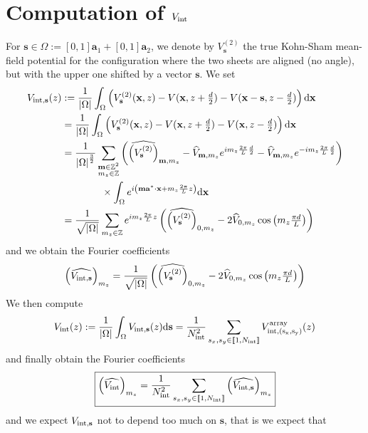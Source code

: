 \documentclass[11pt,a4paper,reqno,french,tikz]{amsart}
\def\d{{\rm d}}
\newcommand{\intent}[1]{\llbracket #1 \rrbracket}
\newcommand{\pa}[1]{\left( #1 \right)} %
\newcommand{\ab}[1]{\left|#1\right|} %
\newcommand{\f}[2]{\frac{#1}{#2}} %
\newcommand{\ind}[1]{_{\textup{#1}}} %
\def\ba{{\mathbf a}}
\def\bx{{\mathbf x}}
\def\bmm{{\mathbf m}}
\def\bs{{\mathbf s}}
\newcommand{\dd}{\tfrac{d}{2}}
\begin{document}
\section{Computation of $V\ind{int}$}%
\label{sec:computation_of_vint_}

For $\bs \in \Omega := [0,1] \ba_1 + [0,1] \ba_2$, we denote by $V^{(2)}_{\bs}$ the true Kohn-Sham mean-field potential for the configuration where the two sheets are aligned (no angle), but with the upper one shifted by a vector $\bs$. We set
\begin{align*}
	V_{\rm int, \bs}(z) &:= \f{1}{\ab{\Omega}} \int_{\Omega}  \left( V^{(2)}_{\bs}(\bx, z) - V(\bx, z + \dd) - V(\bx - \bs, z -\dd)   \right) \d \bx \\
	&= \f{1}{\ab{\Omega}} \int_{\Omega}  \left( V^{(2)}_{\bs}(\bx, z) - V(\bx, z + \dd) - V(\bx, z -\dd)   \right) \d \bx \\
    &= \f{1}{\ab{\Omega}^{\f 32}} \sum_{\substack{\bmm \in \Z^2 \\ m_z \in \Z}}  \pa{ \widehat{\pa{V^{(2)}_{\bs}}}_{\bmm,m_z} - \widehat{V}_{\bmm,m_z}e^{i m_z \f{2\pi}{L} \f{d}{2}} -\widehat{V}_{\bmm,m_z} e^{-i m_z \f{2\pi}{L} \f{d}{2}}} \\
    &\qquad \qquad \times \int_{\Omega} e^{i \pa{\bmm \ba^* \cdot \bx + m_z \f{2\pi}{L} z}}\d \bx \\
    &= \f{1}{\sqrt{\ab{\Omega}}}\sum_{\substack{m_z \in \Z}} e^{i  m_z \f{2\pi}{L} z} \pa{ \widehat{\pa{V^{(2)}_{\bs}}}_{0,m_z} - 2 \widehat{V}_{0,m_z} \cos\pa{ m_z \tfrac{\pi d}{L} }}
\end{align*}
and we obtain the Fourier coefficients
\begin{align*}
\pa{\widehat{V_{\rm{int},\bs}}}_{m_z} =\f{1}{\sqrt{\ab{\Omega}}} \pa{\widehat{\pa{V^{(2)}_{\bs}}}_{0,m_z} - 2 \widehat{V}_{0,m_z} \cos\pa{ m_z \tfrac{\pi d}{L} }}
\end{align*}
We then compute
\begin{align*}
V\ind{int}(z) := \f{1}{\ab{\Omega}} \int_\Omega V_{\rm int, \bs}(z) \d \bs = \f{1}{N\ind{int}^2} \sum_{\substack{s_x,s_y \in \intent{1,N\ind{int}}}} V^{\rm{array}}_{\rm int, (s_x,s_y)}(z)
\end{align*}
and finally obtain the Fourier coefficients
\begin{align*}
\boxed{\pa{\widehat{V\ind{int}}}_{m_z} = \f{1}{N\ind{int}^2} \sum_{\substack{s_x,s_y \in \intent{1,N\ind{int}}}} \pa{\widehat{V_{\rm{int},\bs}}}_{m_z}}
\end{align*}
and we expect $V_{\rm{int},\bs}$ not to depend too much on $\bs$, that is we expect that
\end{document}

